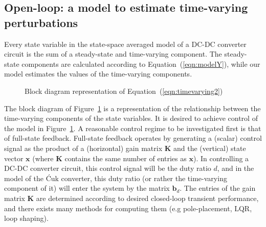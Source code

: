 \subsection{Open-loop: a model to estimate time-varying perturbations}
Every state variable in the state-space averaged model of a DC-DC converter circuit is the sum of a steady-state and time-varying component. The steady-state components are calculated according to Equation~(\ref{eqn:modelY}), while our model estimates the values of the time-varying components.
\begin{figure}[H]
\centering
{}
\caption{Block diagram representation of Equation~(\ref{eqn:timevarying2})}
\label{block:openloop}
\end{figure}
The block diagram of Figure~\ref{block:openloop} is a representation of the relationship between the time-varying components of the state variables.
\newpar
It is desired to achieve control of the model in Figure~\ref{block:openloop}. A reasonable control regime to be investigated first is that of full-state feedback. Full-state feedback operates by generating a (scalar) control signal as the product of a (horizontal) gain matrix $\boldsymbol{K}$ and the (vertical) state vector $\boldsymbol{x}$ (where $\boldsymbol{K}$ contains the same number of entries as $\boldsymbol{x}$). In controlling a DC-DC converter circuit, this control signal will be the duty ratio $d$, and in the model of the \'Cuk converter, this duty ratio (or rather the time-varying component of it) will enter the system by the matrix $\boldsymbol{b}_d$. The entries of the gain matrix $\boldsymbol{K}$ are determined according to desired closed-loop transient performance, and there exists many methods for computing them (e.g pole-placement, LQR, loop shaping).
